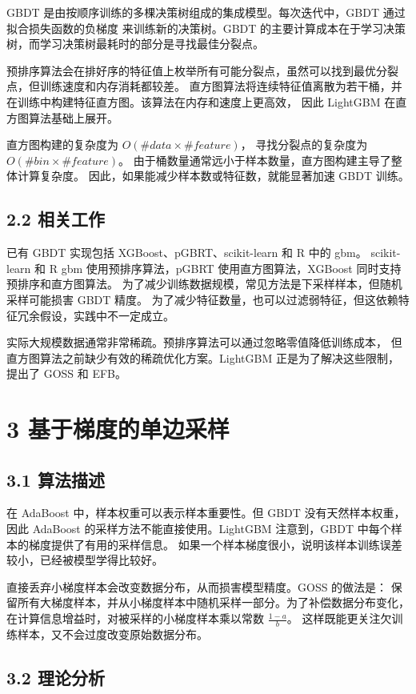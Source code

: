 GBDT 是由按顺序训练的多棵决策树组成的集成模型。每次迭代中，GBDT 通过拟合损失函数的负梯度
来训练新的决策树。GBDT 的主要计算成本在于学习决策树，而学习决策树最耗时的部分是寻找最佳分裂点。

预排序算法会在排好序的特征值上枚举所有可能分裂点，虽然可以找到最优分裂点，但训练速度和内存消耗都较差。
直方图算法将连续特征值离散为若干桶，并在训练中构建特征直方图。该算法在内存和速度上更高效，
因此 LightGBM 在直方图算法基础上展开。

直方图构建的复杂度为 $O(\#data\times \#feature)$，
寻找分裂点的复杂度为 $O(\#bin\times \#feature)$。
由于桶数量通常远小于样本数量，直方图构建主导了整体计算复杂度。
因此，如果能减少样本数或特征数，就能显著加速 GBDT 训练。

\subsection{2.2 相关工作}

已有 GBDT 实现包括 XGBoost、pGBRT、scikit-learn 和 R 中的 gbm。
scikit-learn 和 R gbm 使用预排序算法，pGBRT 使用直方图算法，XGBoost 同时支持预排序和直方图算法。
为了减少训练数据规模，常见方法是下采样样本，但随机采样可能损害 GBDT 精度。
为了减少特征数量，也可以过滤弱特征，但这依赖特征冗余假设，实践中不一定成立。

实际大规模数据通常非常稀疏。预排序算法可以通过忽略零值降低训练成本，
但直方图算法之前缺少有效的稀疏优化方案。LightGBM 正是为了解决这些限制，提出了 GOSS 和 EFB。

\section{3 基于梯度的单边采样}

\subsection{3.1 算法描述}

在 AdaBoost 中，样本权重可以表示样本重要性。但 GBDT 没有天然样本权重，
因此 AdaBoost 的采样方法不能直接使用。LightGBM 注意到，GBDT 中每个样本的梯度提供了有用的采样信息。
如果一个样本梯度很小，说明该样本训练误差较小，已经被模型学得比较好。

直接丢弃小梯度样本会改变数据分布，从而损害模型精度。GOSS 的做法是：
保留所有大梯度样本，并从小梯度样本中随机采样一部分。为了补偿数据分布变化，
在计算信息增益时，对被采样的小梯度样本乘以常数 $\frac{1-a}{b}$。
这样既能更关注欠训练样本，又不会过度改变原始数据分布。

\subsection{3.2 理论分析}

